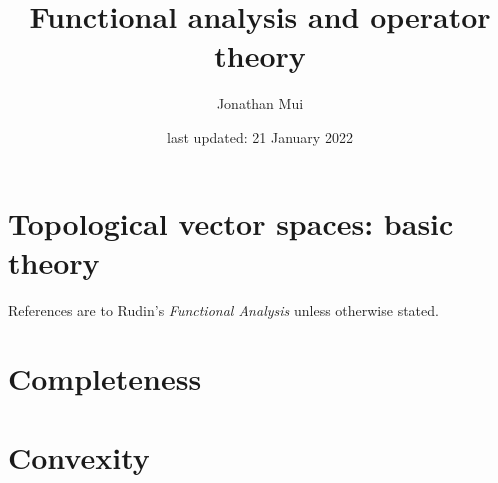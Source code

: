 \documentclass[11pt]{article}
\title{Functional analysis and operator theory}
\author{Jonathan Mui}
\date{last updated: 21 January 2022}
\begin{document}
	
	\maketitle
	
	\tableofcontents
	
	\section{Topological vector spaces: basic theory}
	References are to Rudin's \emph{Functional Analysis} unless otherwise stated.
	
	
	\section{Completeness}
	
	
	\section{Convexity}
	
	
\end{document}
